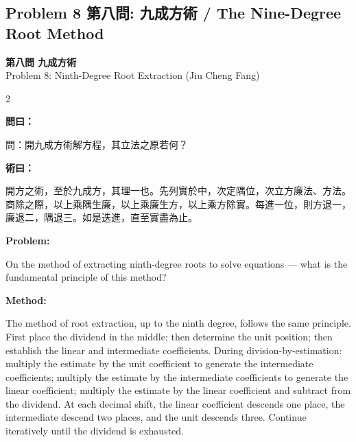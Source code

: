 \documentclass[11pt,a4paper]{article}
\newcommand{\wen}{\textbf{\color{sectioncolor}問}}
\newcommand{\shu}{\textbf{\color{methodcolor}術}}
\newcommand{\prob}{\textbf{\color{sectioncolor}Problem}}
\newcommand{\meth}{\textbf{\color{methodcolor}Method}}
\newcommand{\probheader}[2]{%
  \begin{center}
  \colorbox{problembg}{\parbox{\dimexpr\linewidth-4pt}{%
    \centering\smallskip
    {\large\bfseries\color{sectioncolor}#1}\\[0.3em]
    {\normalsize\color{subsectioncolor}#2}%
    \smallskip
  }}
  \end{center}
  \vspace{0.5em}
}
\newenvironment{zhmethod}{%
  \medskip\noindent{\color{methodcolor}\rule{0.9\columnwidth}{0.4pt}}%
  \par\color{methodcolor}\small
}{\par\medskip}
\newenvironment{enmethod}{%
  \medskip\noindent{\color{methodcolor}\rule{0.9\columnwidth}{0.4pt}}%
  \par\color{methodcolor}\small
}{\par\medskip}
\begin{document}
\newpage

\subsection*{Problem 8 第八問: 九成方術 / The Nine-Degree Root Method}

\probheader{第八問 九成方術}{Problem 8: Ninth-Degree Root Extraction (Jiu Cheng Fang)}

\begin{paracol}{2}

\switchcolumn[0]
\noindent\wen\textbf{曰：}

問：開九成方術解方程，其立法之原若何？

\begin{zhmethod}
\noindent\shu\textbf{曰：}

開方之術，至於九成方，其理一也。先列實於中，次定隅位，次立方廉法、方法。商除之際，以上乘隅生廉，以上乘廉生方，以上乘方除實。每進一位，則方退一，廉退二，隅退三。如是迭進，直至實盡為止。
\end{zhmethod}

\switchcolumn[1]
\noindent\prob\textbf{:}

On the method of extracting ninth-degree roots to solve equations --- what is the fundamental principle of this method?

\begin{enmethod}
\noindent\meth\textbf{:}

The method of root extraction, up to the ninth degree, follows the same principle. First place the dividend in the middle; then determine the unit position; then establish the linear and intermediate coefficients. During division-by-estimation: multiply the estimate by the unit coefficient to generate the intermediate coefficients; multiply the estimate by the intermediate coefficients to generate the linear coefficient; multiply the estimate by the linear coefficient and subtract from the dividend. At each decimal shift, the linear coefficient descends one place, the intermediate descend two places, and the unit descends three. Continue iteratively until the dividend is exhausted.
\end{enmethod}

\end{paracol}
\end{document}
